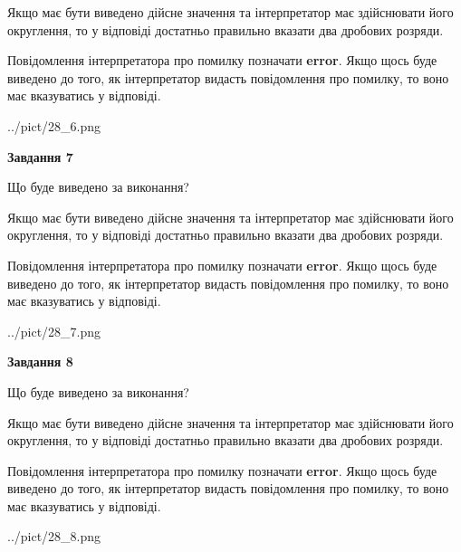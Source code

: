 \documentclass[12pt, ukrainian]{article}
\begin{document}
{\begin {Large}
Якщо має бути виведено дійсне значення та інтерпретатор має здійснювати його округлення, 
то у відповіді достатньо правильно вказати два дробових розряди.

Повідомлення інтерпретатора про помилку позначати \textbf{error}.
Якщо щось буде виведено до того, як інтерпретатор видасть повідомлення про помилку, 
то воно має вказуватись у відповіді. \par

\begin{center}
	{../pict/28_6.png}
\end{center}
\newpage

{\begin {center}\textbf{Завдання 7}\end {center}}\par
Що буде виведено за виконання? \par

Якщо має бути виведено дійсне значення та інтерпретатор має здійснювати його округлення, 
то у відповіді достатньо правильно вказати два дробових розряди.

Повідомлення інтерпретатора про помилку позначати \textbf{error}.
Якщо щось буде виведено до того, як інтерпретатор видасть повідомлення про помилку, 
то воно має вказуватись у відповіді. \par

\begin{center}
	{../pict/28_7.png}
\end{center}
\newpage

{\begin {center}\textbf{Завдання 8}\end {center}}\par
Що буде виведено за виконання? \par

Якщо має бути виведено дійсне значення та інтерпретатор має здійснювати його округлення, 
то у відповіді достатньо правильно вказати два дробових розряди.

Повідомлення інтерпретатора про помилку позначати \textbf{error}.
Якщо щось буде виведено до того, як інтерпретатор видасть повідомлення про помилку, 
то воно має вказуватись у відповіді. \par

\begin{center}
	{../pict/28_8.png}
\end{center}
\newpage


\end{Large}}
\end{document}

